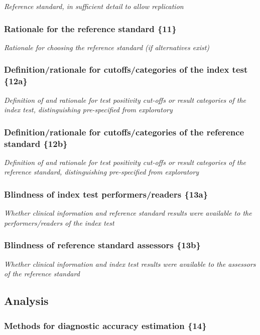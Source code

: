 {\em Reference standard, in sufficient detail to allow replication}

\subsubsection{Rationale for the reference standard \{11\}}

{\em Rationale for choosing the reference standard (if alternatives exist)}

\subsubsection{Definition/rationale for cutoffs/categories of the
  index test \{12a\}}

{\em Definition of and rationale for test positivity cut-offs or
  result categories of the index test, distinguishing pre-specified
  from exploratory}

\subsubsection{Definition/rationale for cutoffs/categories of the
  reference standard \{12b\}}

{\em Definition of and rationale for test positivity cut-offs or
  result categories of the reference standard, distinguishing
  pre-specified from exploratory}

\subsubsection{Blindness of index test performers/readers \{13a\}}

{\em Whether clinical information and reference standard results were
available to the performers/readers of the index test}

\subsubsection{Blindness of reference standard assessors \{13b\}}

{\em Whether clinical information and index test results were available
to the assessors of the reference standard}

\subsection{Analysis}

\subsubsection{Methods for diagnostic accuracy estimation \{14\}}

